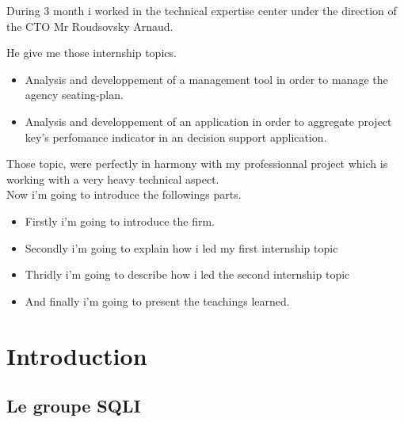 \documentclass{report}
\newcommand{\jumpOne}{\\[1\baselineskip]}
\begin{document}
During 3 month i worked in the technical expertise center under the direction of the CTO Mr Roudsovsky Arnaud. 

He give me those internship topics.
\begin{itemize}
	\item Analysis and developpement of a management tool in order to manage the agency seating-plan. 
	\item Analysis and developpement of an application in order to aggregate project key's perfomance indicator in an decision support application. 
\end{itemize}

Those topic, were perfectly in harmony with my professionnal project which is working with a very heavy technical aspect. 
\jumpOne
Now i'm going to introduce the followings parts.
\begin{itemize}
	\item Firstly i'm going to introduce the firm.
	\item Secondly i'm going to explain how i led my first internship topic
	\item Thridly i'm going to describe how i led the second internship topic 
	\item And finally i'm going to present the teachings learned.   
\end{itemize} 






\newpage






\chapter{Introduction}

\section{Le groupe SQLI}
\end{document}
